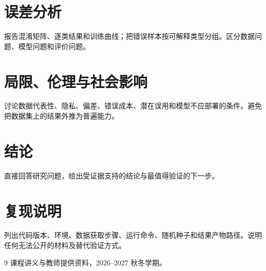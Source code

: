 \documentclass[UTF8,12pt,a4paper]{ctexart}
\begin{document}
\section{误差分析}
报告混淆矩阵、逐类结果和训练曲线；把错误样本按可解释类型分组。区分数据问题、模型问题和评价问题。

\section{局限、伦理与社会影响}
讨论数据代表性、隐私、偏差、错误成本、潜在误用和模型不应部署的条件。避免把数据集上的结果外推为普遍能力。

\section{结论}
直接回答研究问题，给出受证据支持的结论与最值得验证的下一步。

\section*{复现说明}
列出代码版本、环境、数据获取步骤、运行命令、随机种子和结果产物路径。说明任何无法公开的材料及替代验证方式。

\begin{thebibliography}{9}
课程讲义与教师提供资料，2026--2027 秋冬学期。
\end{thebibliography}
\end{document}

